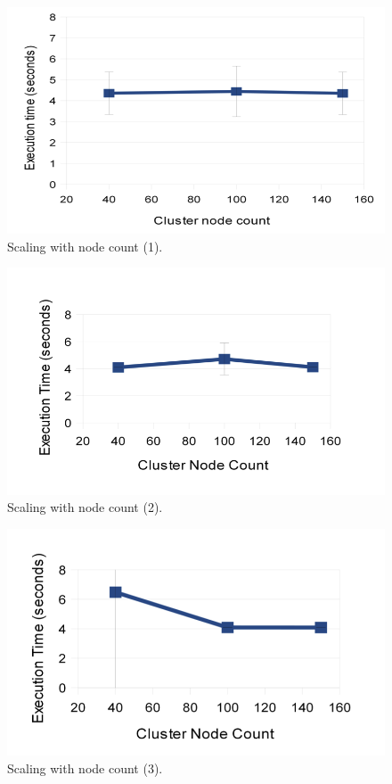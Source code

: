 \documentclass[DM,lsstdraft,toc]{lsstdoc}
\begin{document}
\begin{figure}[H]
\centering
\includegraphics{_static/150_node_scaling_small_1.png}
\caption{Scaling with node count (1).}
\end{figure}

\begin{figure}[H]
\centering
\includegraphics{_static/150_node_scaling_small_2.png}
\caption{Scaling with node count (2).}
\end{figure}

\begin{figure}[H]
\centering
\includegraphics{_static/150_node_scaling_small_3.png}
\caption{Scaling with node count (3).}
\end{figure}
\end{document}
